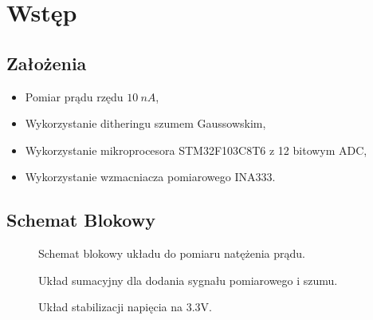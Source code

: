 \section{Wstęp}
    \subsection{Założenia}
        \begin{itemize}
            \item Pomiar prądu rzędu $10\ nA$,
            \item Wykorzystanie ditheringu szumem Gaussowskim, 
            \item Wykorzystanie mikroprocesora STM32F103C8T6 z 12 bitowym ADC,
            \item Wykorzystanie wzmacniacza pomiarowego INA333.
        \end{itemize}
    \subsection{Schemat Blokowy}
    \begin{figure}[!ht]
        \centering
        \scalebox{1}{}
        \caption{Schemat blokowy układu do pomiaru natężenia prądu.}
        \label{sch:BD}
    \end{figure}
    \begin{figure}[!ht]
        \centering
        \scalebox{1}{}
        \caption{Układ sumacyjny dla dodania sygnału pomiarowego i szumu. }
        \label{sch:sumator}
    \end{figure}
    \begin{figure}[!ht]
        \centering
        \scalebox{1}{}
        \caption{Układ stabilizacji napięcia na 3.3V. }
        \label{sch:psu}
    \end{figure}